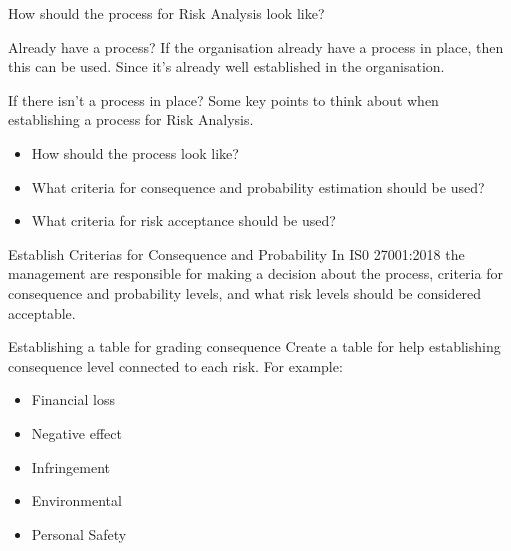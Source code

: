\documentclass{beamer}
\begin{document}
\begin{frame}{How should the process for Risk Analysis look like?}{\insertsubsubsectionhead}
  \footnotesize
  \begin{block}{Already have a process?}
    If the organisation already have a process in place, then this can be used.
    Since it's already well established in the organisation.
  \end{block} 
  \begin{block}{If there isn't a process in place?}
    Some key points to think about when establishing a process for Risk
    Analysis.
    \begin{itemize}
      \item How should the process look like?
      \item What criteria for consequence and probability estimation should be
        used?
      \item What criteria for risk acceptance should be used?
      \end{itemize}
  \end{block}
  \begin{block}{Establish Criterias for Consequence and Probability}
    In IS0 27001:2018 the management are responsible for making a decision
    about the process, criteria for consequence and probability levels, and
    what risk levels should be considered acceptable. 
  \end{block}
\end{frame}
\begin{frame}{Establishing a table for grading consequence}{\insertsubsubsectionhead}
  Create a table for help establishing consequence level connected to each risk.
  For example:
  \begin{itemize}
    \item Financial loss
    \item Negative effect
    \item Infringement
    \item Environmental
    \item Personal Safety
  \end{itemize}
\end{frame}
\end{document}
